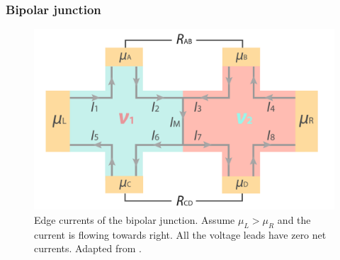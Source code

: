 \documentclass[pdflatex, sectionletters, 12pt]{pittetd}    %
\begin{document}
\subsubsection{Bipolar junction}

\begin{figure}[h!]
	\centering
	\includegraphics[width=.7\textwidth]{Drawing/Bipolar.pdf}
	\caption{Edge currents of the bipolar junction. Assume $\mu_L > \mu_R$ and the current is flowing towards right. All the voltage leads have zero net currents. Adapted from \cite{li2019reconfigurable}.}
	\label{FIG:Bipolar}
\end{figure}
\end{document}
